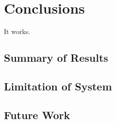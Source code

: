 

\chapter{Conclusions} \label{Chapter: Conclusions}
It works.

\section{Summary of Results}
\section{Limitation of System}
\section{Future Work}